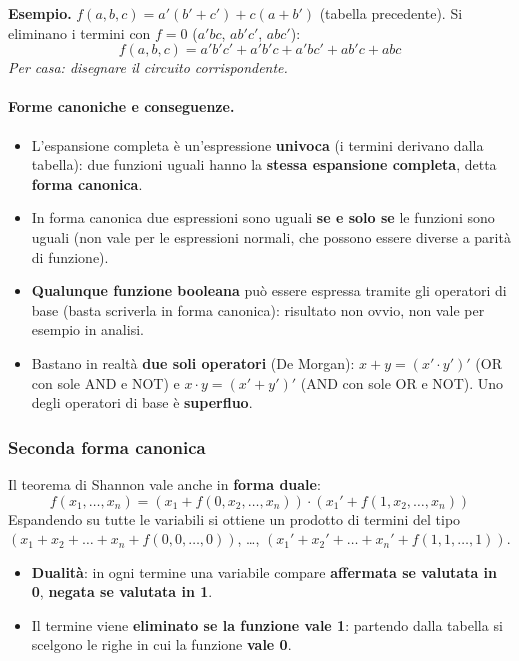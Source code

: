 \documentclass[12pt, a4paper]{article}
\begin{document}
\textbf{Esempio.} $f(a,b,c) = a'(b'+c') + c(a+b')$ (tabella precedente). Si eliminano i termini con $f = 0$ ($a'bc$, $ab'c'$, $abc'$):
$$f(a,b,c) = a'b'c' + a'b'c + a'bc' + ab'c + abc$$
\emph{Per casa: disegnare il circuito corrispondente.}

\paragraph{Forme canoniche e conseguenze.}
\begin{itemize}
    \item L'espansione completa è un'espressione \textbf{univoca} (i termini derivano dalla tabella): due funzioni uguali hanno la \textbf{stessa espansione completa}, detta \textbf{forma canonica}.
    \item In forma canonica due espressioni sono uguali \textbf{se e solo se} le funzioni sono uguali (non vale per le espressioni normali, che possono essere diverse a parità di funzione).
    \item \textbf{Qualunque funzione booleana} può essere espressa tramite gli operatori di base (basta scriverla in forma canonica): risultato non ovvio, non vale per esempio in analisi.
    \item Bastano in realtà \textbf{due soli operatori} (De Morgan): $x + y = (x' \cdot y')'$ (OR con sole AND e NOT) e $x \cdot y = (x' + y')'$ (AND con sole OR e NOT). Uno degli operatori di base è \textbf{superfluo}.
\end{itemize}

\subsubsection{Seconda forma canonica}

Il teorema di Shannon vale anche in \textbf{forma duale}:
$$f(x_1, \dots, x_n) = (x_1 + f(0, x_2, \dots, x_n)) \cdot (x_1' + f(1, x_2, \dots, x_n))$$
Espandendo su tutte le variabili si ottiene un prodotto di termini del tipo $(x_1 + x_2 + \dots + x_n + f(0,0,\dots,0))$, \dots, $(x_1' + x_2' + \dots + x_n' + f(1,1,\dots,1))$.
\begin{itemize}
    \item \textbf{Dualità}: in ogni termine una variabile compare \textbf{affermata se valutata in 0}, \textbf{negata se valutata in 1}.
    \item Il termine viene \textbf{eliminato se la funzione vale 1}: partendo dalla tabella si scelgono le righe in cui la funzione \textbf{vale 0}.
\end{itemize}
\end{document}
